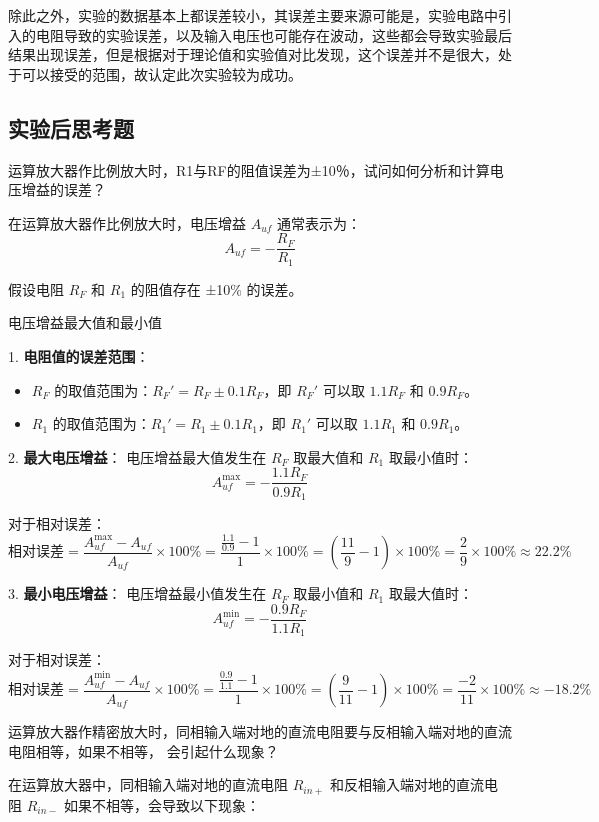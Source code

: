 \documentclass[dvipsnames, svgnames,a4paper,11pt]{article}
\begin{document}
	除此之外，实验的数据基本上都误差较小，其误差主要来源可能是，实验电路中引入的电阻导致的实验误差，以及输入电压也可能存在波动，这些都会导致实验最后结果出现误差，但是根据对于理论值和实验值对比发现，这个误差并不是很大，处于可以接受的范围，故认定此次实验较为成功。
	\subsection{实验后思考题}
	
	\begin{question}
		运算放大器作比例放大时，R1与RF的阻值误差为±10％，试问如何分析和计算电压增益的误差？
	\end{question}
	在运算放大器作比例放大时，电压增益 \( A_{uf} \) 通常表示为：
\[
A_{uf} = -\frac{R_F}{R_1}
\]

假设电阻 \( R_F \) 和 \( R_1 \) 的阻值存在 ±10\% 的误差。

电压增益最大值和最小值

1. \textbf{电阻值的误差范围}：
   \begin{itemize}
       \item \( R_F \) 的取值范围为：\( R_F' = R_F \pm 0.1R_F \)，即 \( R_F' \) 可以取 \( 1.1R_F \) 和 \( 0.9R_F \)。
       \item \( R_1 \) 的取值范围为：\( R_1' = R_1 \pm 0.1R_1 \)，即 \( R_1' \) 可以取 \( 1.1R_1 \) 和 \( 0.9R_1 \)。
   \end{itemize}

2. \textbf{最大电压增益}：
   电压增益最大值发生在 \( R_F \) 取最大值和 \( R_1 \) 取最小值时：
   \[
   A_{uf}^{\text{max}} = -\frac{1.1R_F}{0.9R_1}
   \]

   对于相对误差：
   \[
   \text{相对误差} = \frac{A_{uf}^{\text{max}} - A_{uf}}{A_{uf}} \times 100\% = \frac{\frac{1.1}{0.9} - 1}{1} \times 100\% = \left( \frac{11}{9} - 1 \right) \times 100\% = \frac{2}{9} \times 100\% \approx 22.2\%
   \]

3. \textbf{最小电压增益}：
   电压增益最小值发生在 \( R_F \) 取最小值和 \( R_1 \) 取最大值时：
   \[
   A_{uf}^{\text{min}} = -\frac{0.9R_F}{1.1R_1}
   \]

   对于相对误差：
   \[
   \text{相对误差} = \frac{A_{uf}^{\text{min}} - A_{uf}}{A_{uf}} \times 100\% = \frac{\frac{0.9}{1.1} - 1}{1} \times 100\% = \left( \frac{9}{11} - 1 \right) \times 100\% = \frac{-2}{11} \times 100\% \approx -18.2\%
   \]
	\begin{question}
		运算放大器作精密放大时，同相输入端对地的直流电阻要与反相输入端对地的直流电阻相等，如果不相等，
会引起什么现象？
	\end{question}
	在运算放大器中，同相输入端对地的直流电阻 \( R_{in+} \) 和反相输入端对地的直流电阻 \( R_{in-} \) 如果不相等，会导致以下现象：
\end{document}
